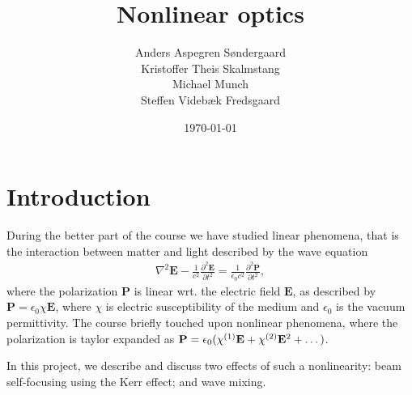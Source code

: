 \documentclass[a4paper,oneside,article]{memoir}
\newcommand\ppdiff[3][\partial]{\frac{#1^2 #2}{#1 #3^2}}
\newcommand{\order}[1]{^{\textup{(#1)}}} %
\begin{document}
\author{
  Anders Aspegren Søndergaard \\
  Kristoffer Theis Skalmstang \\
  Michael Munch \\
  Steffen Videbæk Fredsgaard \\
}
\title{Nonlinear optics}\date{\today}
\maketitle
\begin{abstract}
\end{abstract}
\tableofcontents*
\newpage
\chapter{Introduction}
\label{cha:intro}

During the better part of the course we have studied linear phenomena,
that is the interaction between matter and light described by the wave
equation
\begin{align}
  \label{eq:wave-general}
  \nabla^2 \mathbf E - \frac{1}{c^2} \ppdiff{\mathbf E}{t}
  = \frac{1}{\epsilon_0c^2} \ppdiff{\mathbf P}{t},
\end{align}
where the polarization $\mathbf P$ is linear wrt. the electric field
$\mathbf E$, as described by $\mathbf P = \epsilon_0 \chi
\mathbf E$, where $\chi$ is electric susceptibility of the medium and $\epsilon_0$ is the vacuum permittivity. The
course briefly touched upon nonlinear phenomena, where the polarization
is taylor expanded as $\mathbf P = \epsilon_0 ( \chi\order1 \mathbf E +
\chi\order2 \mathbf E^2 + \dots )$.

In this project, we describe and discuss two effects of such a nonlinearity: beam
self-focusing using the Kerr effect; and wave mixing.










\nocite{*}
\clearpage
\printbibliography
\end{document}
